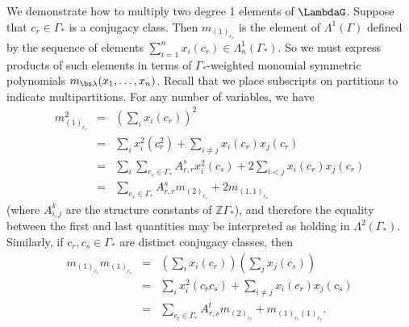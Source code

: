 \begin{example} \label{degree_2_example}
We demonstrate how to multiply two degree 1 elements of $\LambdaG$. Suppose that $c_r \in \Gamma_*$ is a conjugacy class. Then $m_{(1)_{c_r}}$ is the element of $\Lambda^1(\Gamma)$ defined by the sequence of elements $\sum_{i=1}^n x_i(c_r) \in \Lambda_n^1(\Gamma_*)$. So we must express products of such elements in terms of $\Gamma_*$-weighted monomial symmetric polynomials $m_{\bs\lambda}(x_1, \ldots, x_n)$. Recall that we place subscripts on partitions to indicate multipartitions. For any number of variables, we have
\begin{eqnarray*}
m_{(1)_{c_r}}^2 &=& \left( \sum_i x_i(c_r) \right)^2 \\
&=& \sum_i x_i^2(c_r^2) +  \sum_{i \neq j} x_i(c_r) x_j(c_r) \\
&=& \sum_i \sum_{c_s \in \Gamma_*} A_{r,r}^s x_i^2(c_s) + 2 \sum_{i<j} x_i(c_r) x_j(c_r) \\
&=& \sum_{c_s \in \Gamma_*} A_{r,r}^s m_{(2)_{c_s}} + 2 m_{(1,1)_{c_r}}
\end{eqnarray*}
(where $A_{i,j}^k$ are the structure constants of $\mathbb{Z}\Gamma_*$), and therefore the equality between the first and last quantities may be interpreted as holding in $\Lambda^2(\Gamma_*)$. Similarly, if $c_r,c_s \in \Gamma_*$ are distinct conjugacy classes, then 
\begin{eqnarray*}
m_{(1)_{c_r}}m_{(1)_{c_s}} &=& \left( \sum_i x_i(c_r) \right)\left( \sum_j x_j(c_s) \right) \\
&=& \sum_i x_i^2(c_rc_s) +  \sum_{i \neq j} x_i(c_r) x_j(c_s) \\
&=& \sum_{c_t \in \Gamma_*} A_{r,s}^t m_{(2)_{c_t}} +  m_{(1)_{c_r}(1)_{c_s}}.
\end{eqnarray*}
\end{example}

